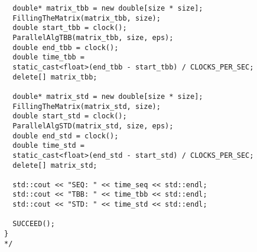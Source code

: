 \documentclass{report}
\begin{document}
\begin{lstlisting}
  double* matrix_tbb = new double[size * size];
  FillingTheMatrix(matrix_tbb, size);
  double start_tbb = clock();
  ParallelAlgTBB(matrix_tbb, size, eps);
  double end_tbb = clock();
  double time_tbb =
  static_cast<float>(end_tbb - start_tbb) / CLOCKS_PER_SEC;
  delete[] matrix_tbb;

  double* matrix_std = new double[size * size];
  FillingTheMatrix(matrix_std, size);
  double start_std = clock();
  ParallelAlgSTD(matrix_std, size, eps);
  double end_std = clock();
  double time_std =
  static_cast<float>(end_std - start_std) / CLOCKS_PER_SEC;
  delete[] matrix_std;

  std::cout << "SEQ: " << time_seq << std::endl;
  std::cout << "TBB: " << time_tbb << std::endl;
  std::cout << "STD: " << time_std << std::endl;

  SUCCEED();
}
*/
\end{lstlisting}
\end{document}
